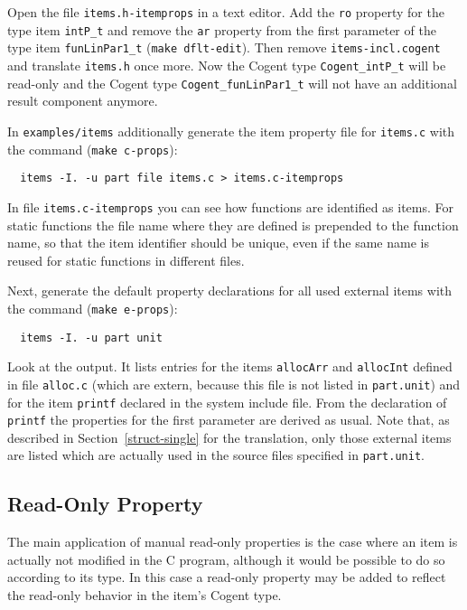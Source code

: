 \documentclass[a4paper]{report}
\newcommand{\code}[1]{\textnormal{\texttt{#1}}}
\begin{document}
Open the file \code{items.h-itemprops} in a text editor. Add the \code{ro} property for the type item \code{intP\_t} and
remove the \code{ar} property from the first parameter of the type item \code{funLinPar1\_t} (\code{make dflt-edit}). Then 
remove \code{items-incl.cogent} and translate \code{items.h} once more. Now the Cogent type \code{Cogent\_intP\_t} will
be read-only and the Cogent type \code{Cogent\_funLinPar1\_t} will not have an additional result component anymore.

In \code{examples/items} additionally
generate the item property file for \code{items.c} with the command (\code{make c-props}):
\begin{verbatim}
  items -I. -u part file items.c > items.c-itemprops
\end{verbatim}

In file \code{items.c-itemprops} you can see how functions are identified as items. For static functions the file name where
they are defined is prepended to the function name, so that the item identifier should be unique, even if the same name 
is reused for static functions in different files.

Next, generate the default property declarations for all used external items with the command (\code{make e-props}):
\begin{verbatim}
  items -I. -u part unit
\end{verbatim}

Look at the output. It lists entries for the items \code{allocArr} and \code{allocInt} defined in file \code{alloc.c} (which 
are extern, because this file is not listed in \code{part.unit}) and for the item \code{printf} declared in the system
include file. From the declaration of \code{printf} the properties for the first parameter are derived as usual. Note that,
as described in Section~\ref{struct-single} for the translation, only those external items are listed which are actually used in the 
source files specified in \code{part.unit}.

\subsection{Read-Only Property}
\label{types-manprops-ro}

The main application of manual read-only properties is the case where an item is actually not modified in the C program, 
although it would be possible to do so according to its type. In this case a read-only property may be added to reflect
the read-only behavior in the item's Cogent type.
\end{document}
